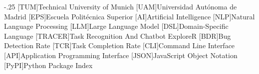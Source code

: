 \documentclass[headsepline,footsepline,footinclude=false,oneside,fontsize=11pt,paper=a4,listof=totoc,bibliography=totoc]{scrbook} %
\begin{document}

\frontmatter{}





\tableofcontents{}

\mainmatter{}









\appendix{}


\begin{acronym}
	\itemsep-.25\baselineskip
	[TUM]{Technical University of Munich}
  [UAM]{Universidad Autónoma de Madrid}
  [EPS]{Escuela Politécnica Superior}
  [AI]{Artificial Intelligence}
  [NLP]{Natural Language Processing}
  [LLM]{Large Language Model}
  [DSL]{Domain-Specific Language}
  [TRACER]{Task Recognition And Chatbot ExploreR}
  [BDR]{Bug Detection Rate}
  [TCR]{Task Completion Rate}
  [CLI]{Command Line Interface}
  [API]{Application Programming Interface}
  [JSON]{JavaScript Object Notation}
  [PyPI]{Python Package Index}
\end{acronym}

\listoffigures{}
\listoftables{}
\printbibliography{}
\end{document}
